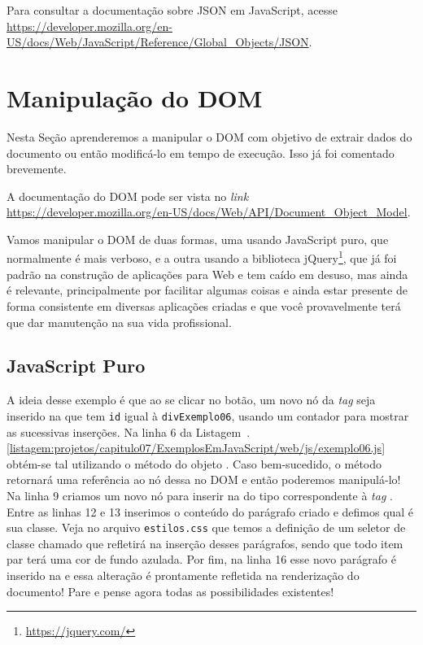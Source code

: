 \begin{saibaMais}
    Para consultar a documentação sobre JSON em JavaScript, acesse \url{https://developer.mozilla.org/en-US/docs/Web/JavaScript/Reference/Global_Objects/JSON}.
\end{saibaMais}



\section{Manipulação do DOM}

Nesta Seção aprenderemos a manipular o DOM com objetivo de extrair dados do documento ou então modificá-lo em tempo de execução. Isso já foi comentado brevemente.

\begin{saibaMais}
    A documentação do DOM pode ser vista no \textit{link} \url{https://developer.mozilla.org/en-US/docs/Web/API/Document_Object_Model}.
\end{saibaMais}

Vamos manipular o DOM de duas formas, uma usando JavaScript puro, que normalmente é mais verboso, e a outra usando a biblioteca jQuery\footnote{\url{https://jquery.com/}}, que já foi padrão na construção de aplicações para Web e tem caído em desuso, mas ainda é relevante, principalmente por facilitar algumas coisas e ainda estar presente de forma consistente em diversas aplicações criadas e que você provavelmente terá que dar manutenção na sua vida profissional.


\subsection{JavaScript Puro}

A ideia desse exemplo é que ao se clicar no botão, um novo nó da \textit{tag}  seja inserido na  que tem \texttt{id} igual à \texttt{divExemplo06}, usando um contador para mostrar as sucessivas inserções. Na linha 6 da Listagem~\thechapter.\ref{listagem:projetos/capitulo07/ExemplosEmJavaScript/web/js/exemplo06.js} obtém-se tal  utilizando o método  do objeto . Caso bem-sucedido, o método retornará uma referência ao nó dessa  no DOM e então poderemos manipulá-lo! Na linha 9 criamos um novo nó para inserir na  do tipo correspondente à \textit{tag} . Entre as linhas 12 e 13 inserimos o conteúdo do parágrafo criado e defimos qual é sua classe. Veja no arquivo \texttt{estilos.css} que temos a definição de um seletor de classe chamado  que refletirá na inserção desses parágrafos, sendo que todo item par terá uma cor de fundo azulada. Por fim, na linha 16 esse novo parágrafo é inserido na  e essa alteração é prontamente refletida na renderização do documento! Pare e pense agora todas as possibilidades existentes!

